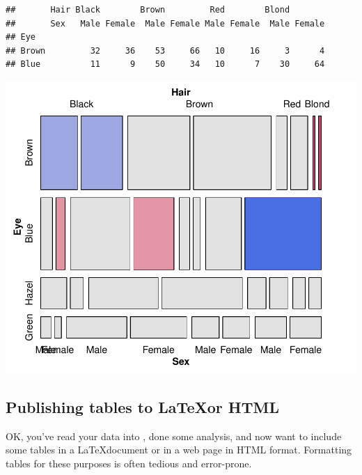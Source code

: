 \documentclass[11pt]{book}
\renewenvironment{knitrout}{\small\renewcommand{\baselinestretch}{.85}}{} %
\begin{document}
\begin{knitrout}
\color{fgcolor}\begin{kframe}
\begin{alltt}
 \hlkwb{<-} \hlopt{+} \hlopt{~}    
\hlstd{HSE[}\hlopt{:}\hlstd{,]}                                         
\end{alltt}
\begin{verbatim}
##       Hair Black        Brown         Red        Blond       
##       Sex   Male Female  Male Female Male Female  Male Female
## Eye                                                          
## Brown         32     36    53     66   10     16     3      4
## Blue          11      9    50     34   10      7    30     64
\end{verbatim}
\begin{alltt}
 \hlstd{=}\hlstd{,} \hlstd{=}\hlstd{)}             
\end{alltt}
\end{kframe}

\centerline{\includegraphics[width=.7\textwidth]{ch02/fig/structable1} }



\end{knitrout}

\subsection{Publishing tables to \LaTeX or HTML}
OK, you've read your data into \R, done some analysis, and now want to
include some tables in a \LaTeX document or in a web page in HTML format.
Formatting tables for these purposes is often tedious and error-prone.
\end{document}
